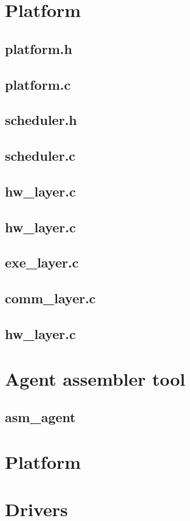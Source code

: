 \documentclass{scrreprt}
\begin{document}
\section{Platform}
\subsection{platform.h}

\subsection{platform.c}

\subsection{scheduler.h}

\subsection{scheduler.c}

\subsection{hw\_layer.c}

\subsection{hw\_layer.c}
%
\subsection{exe\_layer.c}
%
\subsection{comm\_layer.c}
%
\subsection{hw\_layer.c}
\section{Agent assembler tool}
\subsection{asm\_agent}
%
\lstset{
	language=Python,
	}
\section{Platform}

\section{Drivers}
\end{document}
